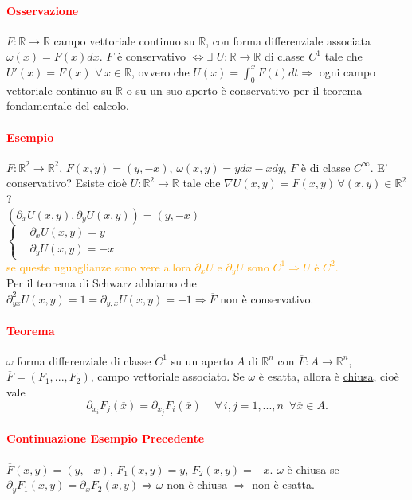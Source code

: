 \documentclass{article}
\newcommand{\R}{\mathbb{R}}
\begin{document}
\paragraph{\textcolor{red}{Osservazione}}
$F:\R\rightarrow \R$ campo vettoriale continuo su $\R$, con forma differenziale associata $\omega(x)=F(x)dx$. $F$ è conservativo $\Leftrightarrow \exists \,\, U : \R \rightarrow \R$ di classe $C^1$ tale che $U'(x)=F(x)\,\, \forall \, x \in \R$, ovvero che $U(x)=\int_0^xF(t)dt \Rightarrow$ ogni campo vettoriale continuo su $\R$ o su un suo aperto è conservativo per il teorema fondamentale del calcolo.
\paragraph{\textcolor{red}{Esempio}}
$\overline{F}:\R^2\rightarrow \R^2$, $\overline{F}(x,y)=(y,-x)$, $\omega (x,y)=ydx-xdy$, $\overline{F}$ è di classe $C^\infty$. E' conservativo? Esiste cioè $U:\R^2 \rightarrow \R$ tale che $\nabla U(x,y)=\overline{F}(x,y)\,\forall (x,y)\in \R^2$?\\
$(\partial_xU(x,y),\partial_yU(x,y))=(y,-x)$\\
$\begin{cases}
    &\partial_xU(x,y)=y\\
    &\partial_yU(x,y)=-x
\end{cases}$\\
\textcolor{orange}{se queste uguaglianze sono vere allora $\partial_xU$ e $\partial_yU$ sono $C^1 \Rightarrow U$ è $C^2$.}\\
Per il teorema di Schwarz abbiamo che $\partial_{yx}^2U(x,y)=1=\partial_{y,x}U(x,y)=-1 \Rightarrow \overline{F}$ non è conservativo.

\paragraph{\textcolor{red}{Teorema}}
$\omega$ forma differenziale di classe $C^1$ su un aperto $A$ di $\R^n$ con $\overline{F}:A \rightarrow \R^n$,  $\overline{F}=(F_1,...,F_2)$, campo vettoriale associato. Se $\omega$ è esatta, allora è \underline{chiusa}, cioè vale
\begin{equation*}
    \partial_{x_i}F_j(\overline{x})=\partial_{x_j}F_i(\overline{x})\,\,\,\,\,\,\,\forall \, i,j=1,...,n\,\,\, \forall \overline{x}\in A.
\end{equation*}

\paragraph{\textcolor{red}{Continuazione Esempio Precedente}}
$\overline{F}(x,y)=(y,-x)$, $F_1(x,y)=y$, $F_2(x,y)=-x$. $\omega$ è chiusa se $\partial_yF_1(x,y)=\partial_xF_2(x,y)\Rightarrow \omega$ non è chiusa $\Rightarrow$ non è esatta.
\end{document}
